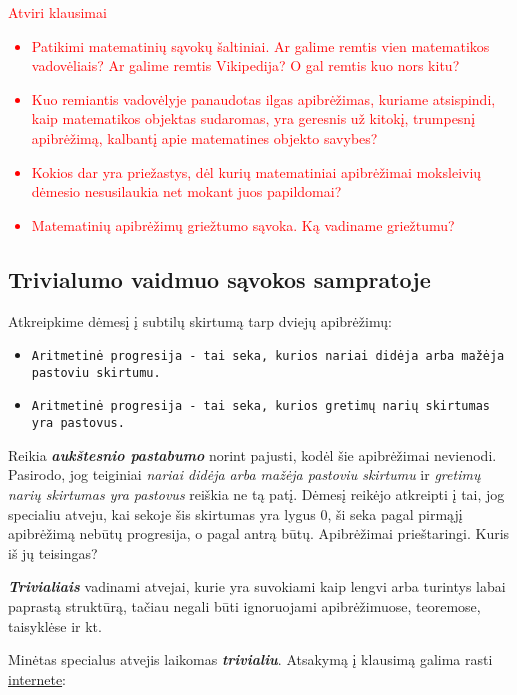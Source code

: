 \documentclass{article}
\begin{document}
\textcolor{red}{
Atviri klausimai
\begin{itemize}
\item Patikimi matematinių sąvokų šaltiniai. Ar galime remtis vien matematikos vadovėliais? Ar galime remtis Vikipedija? O gal remtis kuo nors kitu?
\item Kuo remiantis vadovėlyje panaudotas ilgas apibrėžimas, kuriame atsispindi, kaip matematikos objektas sudaromas, yra geresnis už kitokį, trumpesnį apibrėžimą, kalbantį apie matematines objekto savybes? 
\item Kokios dar yra priežastys, dėl kurių matematiniai apibrėžimai moksleivių dėmesio nesusilaukia net mokant juos papildomai? 
\item Matematinių apibrėžimų griežtumo sąvoka. Ką vadiname griežtumu?
\end{itemize}}

\subsection{Trivialumo vaidmuo sąvokos sampratoje}
Atkreipkime dėmesį į subtilų skirtumą tarp dviejų apibrėžimų:
\begin{itemize}
\item \texttt{Aritmetinė progresija - tai seka, kurios nariai didėja arba mažėja pastoviu skirtumu.}
\item \texttt{Aritmetinė progresija - tai seka, kurios gretimų narių skirtumas yra pastovus.}
\end{itemize}

Reikia \textit{\textbf{aukštesnio pastabumo}} norint pajusti, kodėl šie apibrėžimai nevienodi. Pasirodo, jog teiginiai \textit{nariai didėja arba mažėja pastoviu skirtumu} ir \textit{gretimų narių skirtumas yra pastovus} reiškia ne tą patį. Dėmesį reikėjo atkreipti į tai, jog specialiu atveju, kai sekoje šis skirtumas yra lygus 0, ši seka pagal pirmąjį apibrėžimą nebūtų progresija, o pagal antrą būtų. Apibrėžimai prieštaringi. Kuris iš jų teisingas?
\begin{mdframed}[backgroundcolor=blue!10!white, linewidth=3pt]
\textit{\textbf{Trivialiais}} vadinami atvejai, kurie yra suvokiami kaip lengvi arba turintys labai paprastą struktūrą, tačiau negali būti ignoruojami apibrėžimuose, teoremose, taisyklėse ir kt.
\end{mdframed}

Minėtas specialus atvejis laikomas \textit{\textbf{trivialiu}}. Atsakymą į klausimą galima rasti \href{https://math.stackexchange.com/questions/1437413/can-a-arithmetic-progression-have-a-common-difference-of-zero-a-geometric-prog}{internete}:
\end{document}
